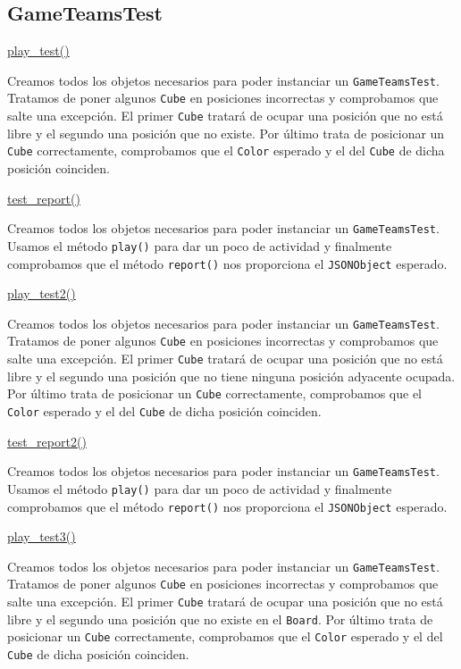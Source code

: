 \documentclass[../DocumentoOficial.tex]{subfiles}
\begin{document}
\subsection{GameTeamsTest}
\underline{play\_test()}

Creamos todos los objetos necesarios para poder instanciar un \texttt{GameTeamsTest}. Tratamos de poner algunos \texttt{Cube} en posiciones incorrectas y comprobamos que salte una excepción. El primer \texttt{Cube} tratará de ocupar una posición que no está libre y el segundo una posición que no existe. Por último trata de posicionar un \texttt{Cube} correctamente, comprobamos que el \texttt{Color} esperado y el del \texttt{Cube} de dicha posición coinciden.

\underline{test\_report()}

Creamos todos los objetos necesarios para poder instanciar un \texttt{GameTeamsTest}. Usamos el método \texttt{play()} para dar un poco de actividad y finalmente comprobamos que el método \texttt{report()} nos proporciona el \texttt{JSONObject} esperado.

\underline{play\_test2()}

Creamos todos los objetos necesarios para poder instanciar un \texttt{GameTeamsTest}. Tratamos de poner algunos \texttt{Cube} en posiciones incorrectas y comprobamos que salte una excepción. El primer \texttt{Cube} tratará de ocupar una posición que no está libre y el segundo una posición que no tiene ninguna posición adyacente ocupada. Por último trata de posicionar un \texttt{Cube} correctamente, comprobamos que el \texttt{Color} esperado y el del \texttt{Cube} de dicha posición coinciden.

\underline{test\_report2()}

Creamos todos los objetos necesarios para poder instanciar un \texttt{GameTeamsTest}. Usamos el método \texttt{play()} para dar un poco de actividad y finalmente comprobamos que el método \texttt{report()} nos proporciona el \texttt{JSONObject} esperado.

\underline{play\_test3()}

Creamos todos los objetos necesarios para poder instanciar un \texttt{GameTeamsTest}. Tratamos de poner algunos \texttt{Cube} en posiciones incorrectas y comprobamos que salte una excepción. El primer \texttt{Cube} tratará de ocupar una posición que no está libre y el segundo una posición que no existe en el \texttt{Board}. Por último trata de posicionar un \texttt{Cube} correctamente, comprobamos que el \texttt{Color} esperado y el del \texttt{Cube} de dicha posición coinciden.
\end{document}

